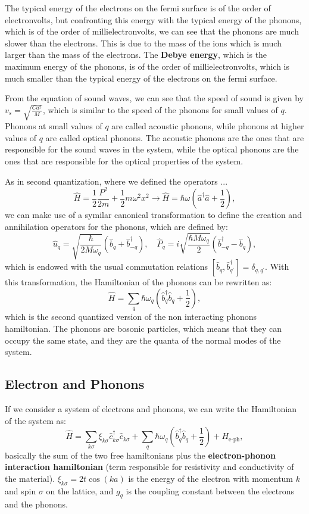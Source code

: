 The typical energy of the electrons on the fermi surface is of the order of electronvolts, but confronting this energy with the typical energy of the phonons, which is of the order of millielectronvolts, we can see that the phonons are much slower than the electrons. This is due to the mass of the ions which is much larger than the mass of the electrons. The \textbf{Debye energy}, which is the maximum energy of the phonons, is of the order of millielectronvolts, which is much smaller than the typical energy of the electrons on the fermi surface.

From the equation of sound waves, we can see that the speed of sound is given by \(v_s = \sqrt{\frac{C a^2}{M}}\), which is similar to the speed of the phonons for small values of $q$. Phonons at small values of $q$ are called acoustic phonons, while phonons at higher values of $q$ are called optical phonons. The acoustic phonons are the ones that are responsible for the sound waves in the system, while the optical phonons are the ones that are responsible for the optical properties of the system.

As in second quantization, where we defined the operators ...
\[
    \hat{H} = \frac{1}{2} \frac{P^2}{2m} + \frac{1}{2} m \omega^2 x^2 \to \hat{H} = \hbar \omega \left( \hat{a}^{\dagger} \hat{a} + \frac{1}{2} \right),
\]
we can make use of a symilar canonical transformation to define the creation and annihilation operators for the phonons, which are defined by:
\[
    \hat{u}_q = \sqrt{\frac{\hbar}{2 M \omega_q}} (\hat{b}_q + \hat{b}_{-q}^{\dagger}), \quad \hat{P}_q = i \sqrt{\frac{\hbar M \omega_q}{2}} (\hat{b}_{-q}^{\dagger} - \hat{b}_q),
\]
which is endowed with the usual commutation relations \([\hat{b}_q, \hat{b}_{q^{\prime}}^{\dagger}] = \delta_{q, q^{\prime}}\). With this transformation, the Hamiltonian of the phonons can be rewritten as:
\[
    \hat{H} = \sum_{q} \hbar \omega_q \left( \hat{b}_q^{\dagger} \hat{b}_q + \frac{1}{2} \right),
\]
which is the second quantized version of the non interacting phonons hamiltonian. The phonons are bosonic particles, which means that they can occupy the same state, and they are the quanta of the normal modes of the system.

\subsection{Electron and Phonons}

If we consider a system of electrons and phonons, we can write the Hamiltonian of the system as:
\[
    \hat{H} = \sum_{k \sigma} \xi_{k \sigma} \hat{c}_{k \sigma}^{\dagger} \hat{c}_{k \sigma} + \sum_{q} \hbar \omega_q \left( \hat{b}_q^{\dagger} \hat{b}_q + \frac{1}{2} \right) + H_{\text{e-ph}},
\]
basically the sum of the two free hamiltonians plus the \textbf{electron-phonon interaction hamiltonian} (term responsible for resistivity and conductivity of the material). \(\xi_{k \sigma} = 2t \cos (k a)\) is the energy of the electron with momentum \(k\) and spin \(\sigma\) on the lattice, and \(g_q\) is the coupling constant between the electrons and the phonons.

